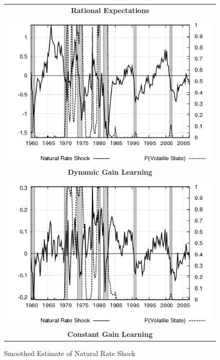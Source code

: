 \documentclass[12pt]{article}
\begin{document}
\begin{figure}[ht]
\begin{center}
\begin{tabular}{c}
\end{tabular}
\end{center}
\end{figure}

\begin{figure}[ht]
\caption{Smoothed Estimate of Natural Rate Shock}\label{fg:natrate}
\begin{center}
\begin{tabular}{c}
\textbf{Rational Expectations} \\  
\includegraphics[scale=0.5]{results_re/natrate.png} \\
\textbf{Dynamic Gain Learning} \\
\includegraphics[scale=0.5]{results_dg8_wlsinit/natrate.png} \\
\textbf{Constant Gain Learning} \\

\end{tabular}
\end{center}
\end{figure}
\end{document}
